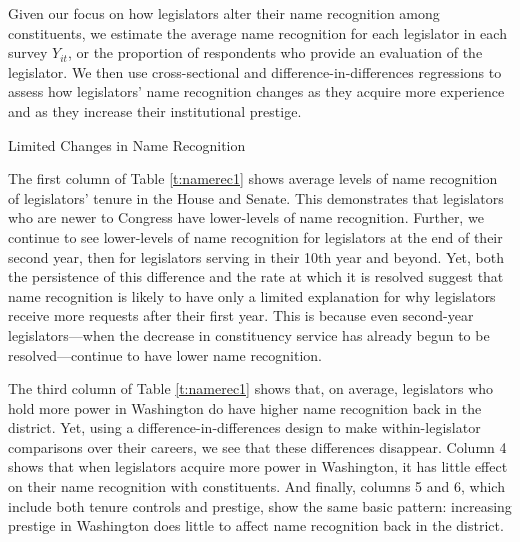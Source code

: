 \documentclass[12pt]{article}
\begin{document}
Given our focus on how legislators alter their name recognition among constituents, we estimate the average name recognition for each legislator in each survey $Y_{it}$, or the proportion of respondents who provide an evaluation of the legislator. We then use cross-sectional and difference-in-differences regressions to assess how legislators' name recognition changes as they acquire more experience and as they increase their institutional prestige.  

\begin{table}[hbt!]
\caption{Limited Changes in Name Recognition} \label{t:namerec1}

\begin{minipage}{\textwidth}
\begin{center}

\end{center}
\end{minipage}
\end{table}


The first column of Table \ref{t:namerec1} shows average levels of name recognition of legislators' tenure in the House and Senate. This demonstrates that legislators who are newer to Congress have lower-levels of name recognition. Further, we continue to see lower-levels of name recognition for legislators at the end of their second year, then for legislators serving in their 10th year and beyond. Yet, both the persistence of this difference and the rate at which it is resolved suggest that name recognition is likely to have only a limited explanation for why legislators receive more requests after their first year. This is because even second-year legislators---when the decrease in constituency service has already begun to be resolved---continue to have lower name recognition.  


The third column of Table \ref{t:namerec1} shows that, on average, legislators who hold more power in Washington do have higher name recognition back in the district. Yet, using a difference-in-differences design to make within-legislator comparisons over their careers, we see that these differences disappear. Column 4 shows that when legislators acquire more power in Washington, it has little effect on their name recognition with constituents. And finally, columns 5 and 6, which include both tenure controls and prestige, show the same basic pattern: increasing prestige in Washington does little to affect name recognition back in the district.  
\end{document}
